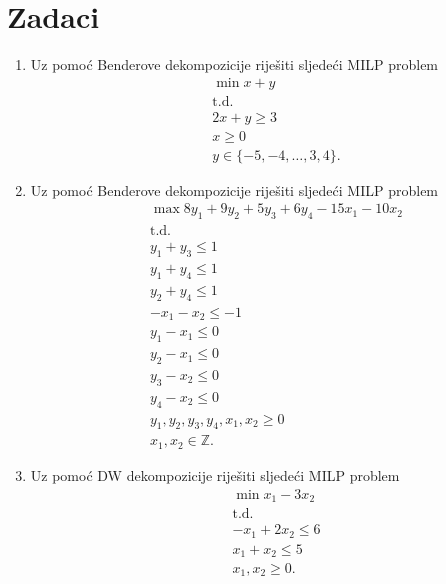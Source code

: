\documentclass[a4paper, utf8, 11pt, colorlinks]{book}
\theoremstyle{definition}
\begin{document}
\section{Zadaci}
\begin{enumerate}
	\item %
	  	Uz pomoć Benderove dekompozicije riješiti sljedeći MILP problem
	  \begin{align*}
	  	   &\min x + y \\
	  	   &\mbox{t.d.} \\
	  	   & 2x + y \geq 3 \\
	  	   & x \geq 0 \\
	  	   & y \in \{-5, -4,\ldots, 3, 4\}.
   	  \end{align*}
	\item %
	Uz pomoć Benderove dekompozicije riješiti sljedeći MILP problem
	\begin{align*}
		 &\max 8 y_1 + 9 y_2 + 5 y_3 + 6 y_4 - 15 x_1 - 10 x_2 \\
		 &\mbox{t.d.} \\
		 &y_1 + y_3 \leq 1 \\
		 & y_1 + y_4 \leq 1 \\
		 &y_2 + y_4 \leq 1 \\
		 & -x_1-x_2 \leq -1 \\
		 & y_1 - x_1 \leq 0 \\
		 & y_2 - x_1 \leq 0 \\
		 & y_3 - x_2 \leq 0 \\
		 & y_4 - x_2 \leq 0 \\
		 & y_1,y_2,y_3,y_4,x_1, x_2 \geq 0 \\
		 & x_1, x_2 \in \mathbb{Z}.
	\end{align*}
\item %
Uz pomoć DW dekompozicije riješiti sljedeći MILP problem
\begin{align*}
	&\min x_1 - 3 x_2 \\
	&\mbox{t.d.} \\
	& -x_1 + 2x_2 \leq 6 \\
	& x_1 + x_2 \leq 5 \\
	& x_1, x_2 \geq 0.
\end{align*}


\end{enumerate}
\end{document}
